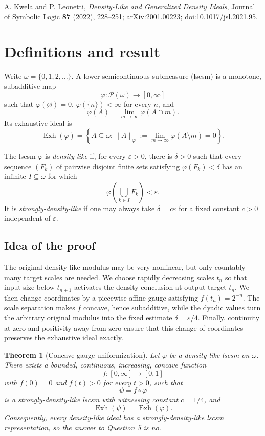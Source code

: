 \documentclass[11pt]{article}
\newtheorem{theorem}{Theorem}
\newcommand{\Exh}{\operatorname{Exh}}
\begin{document}
A. Kwela and P. Leonetti, \emph{Density-Like and Generalized Density Ideals}, Journal of Symbolic Logic \textbf{87} (2022), 228--251; arXiv:2001.00223; doi:10.1017/jsl.2021.95.
\clearpage
\section{Definitions and result}

Write $\omega=\{0,1,2,\ldots\}$. A lower semicontinuous submeasure (lscsm) is a monotone, subadditive map
\[
 \varphi:\mathcal P(\omega)\longrightarrow[0,\infty]
\]
such that $\varphi(\varnothing)=0$, $\varphi(\{n\})<\infty$ for every $n$, and
\[
 \varphi(A)=\lim_{m\to\infty}\varphi(A\cap m).
\]
Its exhaustive ideal is
\[
 \Exh(\varphi)=\left\{A\subseteq\omega:
 \|A\|_\varphi:=\lim_{m\to\infty}\varphi(A\setminus m)=0\right\}.
\]

The lscsm $\varphi$ is \emph{density-like} if, for every $\varepsilon>0$, there is $\delta>0$ such that every sequence $(F_k)$ of pairwise disjoint finite sets satisfying $\varphi(F_k)<\delta$ has an infinite $I\subseteq\omega$ for which
\[
 \varphi\left(\bigcup_{k\in I}F_k\right)<\varepsilon.
\]
It is \emph{strongly-density-like} if one may always take $\delta=c\varepsilon$ for a fixed constant $c>0$ independent of $\varepsilon$.

\subsection*{Idea of the proof}

The original density-like modulus may be very nonlinear, but only countably many target scales are needed. We choose rapidly decreasing scales $t_n$ so that input size below $t_{n+1}$ activates the density conclusion at output target $t_n$. We then change coordinates by a piecewise-affine gauge satisfying $f(t_n)=2^{-n}$. The scale separation makes $f$ concave, hence subadditive, while the dyadic values turn the arbitrary original modulus into the fixed estimate $\delta=\varepsilon/4$. Finally, continuity at zero and positivity away from zero ensure that this change of coordinates preserves the exhaustive ideal exactly.

\begin{theorem}[Concave-gauge uniformization]\label{thm:main}
Let $\varphi$ be a density-like lscsm on $\omega$. There exists a bounded, continuous, increasing, concave function
\[
 f:[0,\infty]\longrightarrow[0,1]
\]
with $f(0)=0$ and $f(t)>0$ for every $t>0$, such that
\[
 \psi=f\circ\varphi
\]
is a strongly-density-like lscsm with witnessing constant $c=1/4$, and
\[
 \Exh(\psi)=\Exh(\varphi).
\]
Consequently, every density-like ideal has a strongly-density-like lscsm representation, so the answer to Question 5 is \emph{no}.
\end{theorem}
\end{document}
